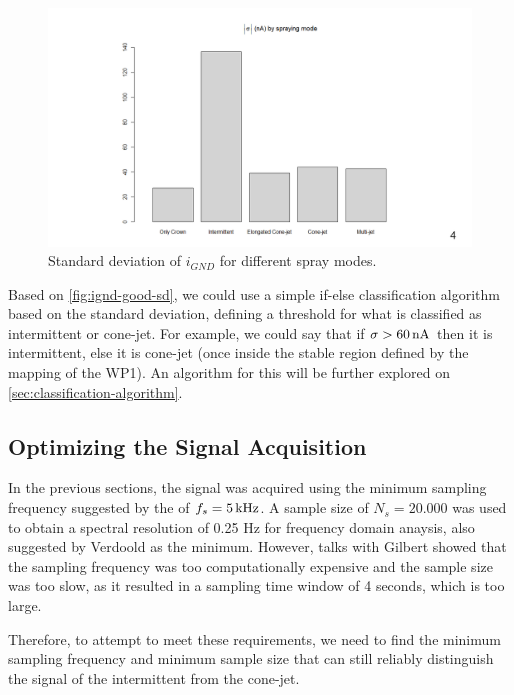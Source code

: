\documentclass[oneside,12pt]{article}
\begin{document}
\begin{figure}[h!]
    \centering
    \includegraphics[width=1\textwidth,trim=1 1 1 1,clip]{figures/ignd-good-sd.png}
    \caption{Standard deviation of $i_{GND}$ for different spray modes.}
    \label{fig:ignd-good-sd}
\end{figure}

Based on \autoref{fig:ignd-good-sd}, we could use a simple if-else classification algorithm based on the standard deviation, 
defining a threshold for what is classified as intermittent or cone-jet. For example, we could say that if $\sigma > 60 \,\mathrm{nA}$
then it is intermittent, else it is cone-jet (once inside the stable region defined by the mapping of the WP1).
An algorithm for this will be further explored on \autoref{sec:classification-algorithm}.


\subsection{Optimizing the Signal Acquisition}

In the previous sections, the signal was acquired using the minimum sampling frequency
suggested by the \cite{Verdoold2013} of $f_s = 5 \,\mathrm{kHz}$. A sample size of $N_s = 20.000$ was used to obtain a spectral resolution of 0.25 Hz
for frequency domain anaysis, also suggested by Verdoold as the minimum. However, talks with Gilbert showed that the sampling frequency was too
computationally expensive and the sample size was too slow, as it resulted in a sampling time window of 4 seconds, which is too large.

Therefore, to attempt to meet these requirements, we need to find the minimum sampling frequency and
minimum sample size that can still reliably distinguish the signal of the intermittent from the cone-jet.
\end{document}
